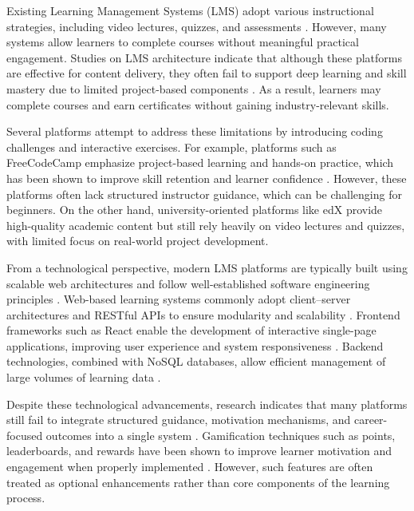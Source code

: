 \documentclass[final,3p,times,twocolumn]{elsarticle}
\begin{document}
Existing Learning Management Systems (LMS) adopt various instructional strategies, including video lectures, quizzes, and assessments \cite{pahl2008learning}. However, many systems allow learners to complete courses without meaningful practical engagement. Studies on LMS architecture indicate that although these platforms are effective for content delivery, they often fail to support deep learning and skill mastery due to limited project-based components \cite{graf2010adaptivity}. As a result, learners may complete courses and earn certificates without gaining industry-relevant skills.

Several platforms attempt to address these limitations by introducing coding challenges and interactive exercises. For example, platforms such as FreeCodeCamp emphasize project-based learning and hands-on practice, which has been shown to improve skill retention and learner confidence \cite{ehlers2011quality}. However, these platforms often lack structured instructor guidance, which can be challenging for beginners. On the other hand, university-oriented platforms like edX provide high-quality academic content but still rely heavily on video lectures and quizzes, with limited focus on real-world project development.

From a technological perspective, modern LMS platforms are typically built using scalable web architectures and follow well-established software engineering principles \cite{pressman2014software}. Web-based learning systems commonly adopt client–server architectures and RESTful APIs to ensure modularity and scalability \cite{fielding2000rest,restful2017api}. Frontend frameworks such as React enable the development of interactive single-page applications, improving user experience and system responsiveness \cite{spa2021web,react2020docs}. Backend technologies, combined with NoSQL databases, allow efficient management of large volumes of learning data \cite{database2018nosql,mongo2019definitive}.

Despite these technological advancements, research indicates that many platforms still fail to integrate structured guidance, motivation mechanisms, and career-focused outcomes into a single system \cite{cloud2020education}. Gamification techniques such as points, leaderboards, and rewards have been shown to improve learner motivation and engagement when properly implemented \cite{ux2019education}. However, such features are often treated as optional enhancements rather than core components of the learning process.
\end{document}
